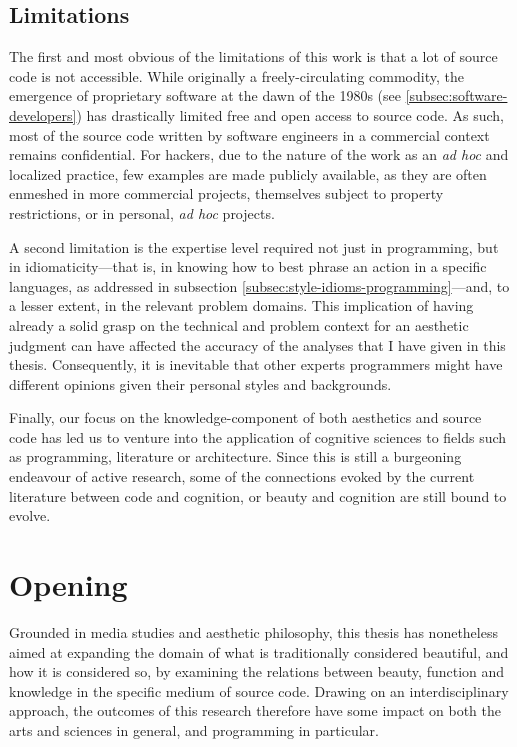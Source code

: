 \subsection{Limitations}
\label{subsec:conclusion-limitations}

The first and most obvious of the limitations of this work is that a lot of source code is not accessible. While originally a freely-circulating commodity, the emergence of proprietary software at the dawn of the 1980s (see \ref{subsec:software-developers}) has drastically limited free and open access to source code. As such, most of the source code written by software engineers in a commercial context remains confidential. For hackers, due to the nature of the work as an \emph{ad hoc} and localized practice, few examples are made publicly available, as they are often enmeshed in more commercial projects, themselves subject to property restrictions, or in personal, \emph{ad hoc} projects.

A second limitation is the expertise level required not just in programming, but in idiomaticity—that is, in knowing how to best phrase an action in a specific languages, as addressed in subsection \ref{subsec:style-idioms-programming}—and, to a lesser extent, in the relevant problem domains. This implication of having already a solid grasp on the technical and problem context for an aesthetic judgment can have affected the accuracy of the analyses that I have given in this thesis. Consequently, it is inevitable that other experts programmers might have different opinions given their personal styles and backgrounds.

Finally, our focus on the knowledge-component of both aesthetics and source code has led us to venture into the application of cognitive sciences to fields such as programming, literature or architecture. Since this is still a burgeoning endeavour of active research,  some of the connections evoked by the current literature between code and cognition, or beauty and cognition are still bound to evolve.

\section{Opening}
\label{sec:opening}

Grounded in media studies and aesthetic philosophy, this thesis has nonetheless aimed at expanding the domain of what is traditionally considered beautiful, and how it is considered so, by examining the relations between beauty, function and knowledge in the specific medium of source code. Drawing on an interdisciplinary approach, the outcomes of this research therefore have some impact  on both the arts and sciences in general, and programming in particular.

